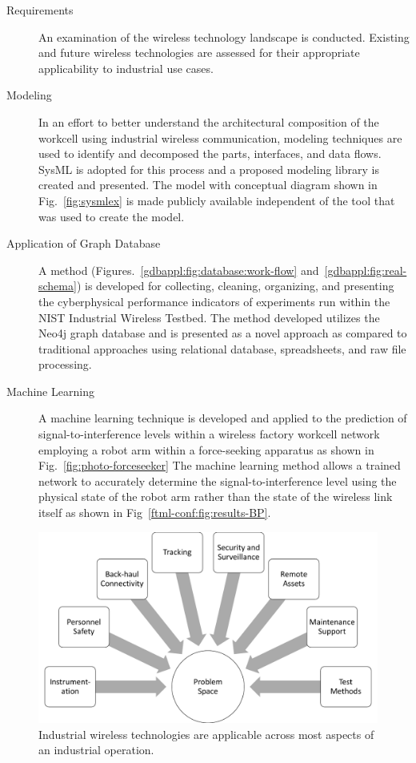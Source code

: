 \documentclass{article}
\begin{document}
		\begin{description}
			\item[Requirements] An examination of the wireless technology landscape is conducted.  Existing and future wireless technologies are assessed for their appropriate applicability to industrial use cases.
			
			\item[Modeling] In an effort to better understand the architectural composition of the workcell using industrial wireless communication, modeling techniques are used to identify and decomposed the parts, interfaces, and data flows.  SysML is adopted for this process and a proposed modeling library is created and presented.  The model with conceptual diagram shown in Fig.~\ref{fig:sysmlex} is made publicly available independent of the tool that was used to create the model.
			
			\item[Application of Graph Database] A method (Figures.~\ref{gdbappl:fig:database:work-flow} and~\ref{gdbappl:fig:real-schema}) is developed for collecting, cleaning, organizing, and presenting the cyberphysical performance indicators of experiments run within the NIST Industrial Wireless Testbed. The method developed utilizes the Neo4j graph database and is presented as a novel approach as compared to traditional approaches using relational database, spreadsheets, and raw file processing.
			
			\item[Machine Learning] A machine learning technique is developed and applied to the prediction of signal-to-interference levels within a wireless factory workcell network employing a robot arm within a force-seeking apparatus as shown in Fig.~\ref{fig:photo-forceseeker}  The machine learning method allows a trained network to accurately determine the signal-to-interference level using the physical state of the robot arm rather than the state of the wireless link itself as shown in Fig~\ref{ftml-conf:fig:results-BP}.
		\end{description}
	
		\begin{figure}[t]
			\centering
			\includegraphics[width=\columnwidth]{images/probsp}
			\caption{Industrial wireless technologies are applicable across most aspects of an industrial operation.}
			\label{fig:problemspace}
		\end{figure}   
	
\end{document}
